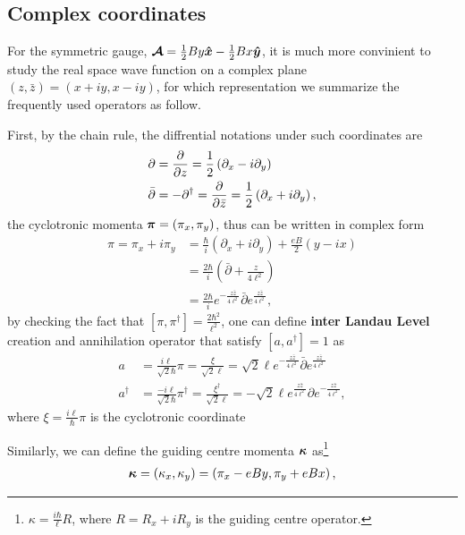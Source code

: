 \documentclass[%
nofootinbib,
 amsmath,amssymb,
 aps,onecolumn,
prb
]{revtex4-2}
\newcommand{\zz}{\bar{z}}
\newcommand{\overpartial}{\bar{\partial}}
\begin{document}
\subsection{Complex coordinates}
For the symmetric gauge, $\vb*{\mathcal{A}}=\frac{1}{2}By\vu*{x}-\frac{1}{2}Bx\vu*{y}$, it is much more convinient to study the real space wave function on a complex plane $\left(z,\zz\right)=\left(x+iy,x-iy\right)$,
for which representation we summarize the frequently used operators as follow.\par 
First, by the chain rule, the diffrential notations under such coordinates are 
\begin{align}
    \partial&=\pdv{z}=\frac{1}{2}\left(\partial_x-i\partial_y\right) \nonumber\\ 
    \overpartial&=-\partial^\dag=\pdv{\zz}=\frac{1}{2}\left(\partial_x+i\partial_y\right),
\end{align}
the cyclotronic momenta $\vb*{\pi}=\left(\pi_x,\pi_y\right)$, thus can be written in complex form 
\begin{align}
    \pi=\pi_x+i\pi_y&=\frac{\hbar}{i}\left(\partial_x+i\partial_y\right)+\frac{eB}{2}\left(y-ix\right)\nonumber\\ 
    &=\frac{2\hbar}{i}\left(\overpartial+\frac{z}{4\ell^2}\right)\nonumber\\ 
    &=\frac{2\hbar}{i}e^{-\frac{z\zz}{4\ell^2}}\overpartial e^{\frac{z\zz}{4\ell^2}},
\end{align}
by checking the fact that $[\pi,\pi^\dag]=\frac{2\hbar^2}{\ell^2}$, one can define \textbf{inter Landau Level} creation and annihilation operator that satisfy $[a,a^\dag]=1$ as 
\begin{align}
    a&=\frac{i\ell}{\sqrt{2}\hbar}\pi=\frac{\xi}{\sqrt{2}\ell}=\sqrt{2}\ell e^{-\frac{z\zz}{4\ell^2}}\overpartial e^{\frac{z\zz}{4\ell^2}}\nonumber\\ 
    a^\dag&=\frac{-i\ell}{\sqrt{2}\hbar}\pi^\dag=\frac{\xi^\dag}{\sqrt{2}\ell}=-\sqrt{2}\ell e^{\frac{z\zz}{4\ell^2}}\partial e^{-\frac{z\zz}{4\ell^2}},
\end{align}
where $\xi=\frac{i\ell}{\hbar}\pi$ is the cyclotronic coordinate\par 
Similarly, we can define the guiding centre momenta $\vb*{\kappa}$  as\footnote{$\kappa=\frac{i\hbar}{\ell}R$, where $R=R_x+iR_y$ is the guiding centre operator.}
\begin{align}
    \vb*{\kappa}=\left(\kappa_x,\kappa_y\right)=\left(\pi_x-eBy,\pi_y+eBx\right),
\end{align} 
\end{document}
